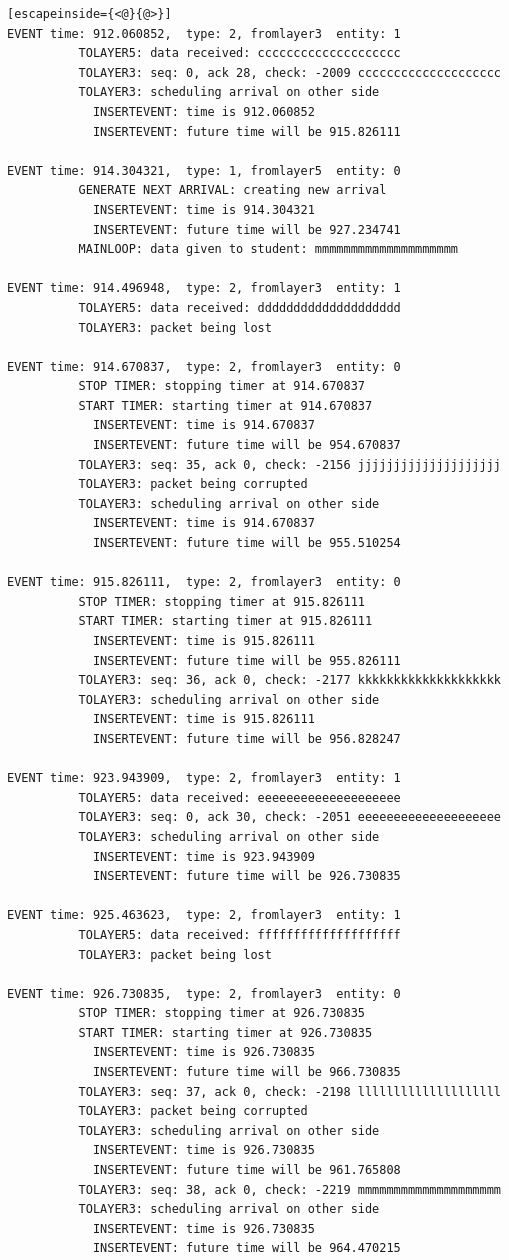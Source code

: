 \documentclass[paper=a4, fontsize=11pt]{scrartcl}
\numberwithin{equation}{section}		%
\numberwithin{figure}{section}			%
\numberwithin{table}{section}				%
\begin{document}
\begin{lstlisting}[escapeinside={<@}{@>}]
EVENT time: 912.060852,  type: 2, fromlayer3  entity: 1
          TOLAYER5: data received: cccccccccccccccccccc
          TOLAYER3: seq: 0, ack 28, check: -2009 cccccccccccccccccccc
          TOLAYER3: scheduling arrival on other side
            INSERTEVENT: time is 912.060852
            INSERTEVENT: future time will be 915.826111

EVENT time: 914.304321,  type: 1, fromlayer5  entity: 0
          GENERATE NEXT ARRIVAL: creating new arrival
            INSERTEVENT: time is 914.304321
            INSERTEVENT: future time will be 927.234741
          MAINLOOP: data given to student: mmmmmmmmmmmmmmmmmmmm

EVENT time: 914.496948,  type: 2, fromlayer3  entity: 1
          TOLAYER5: data received: dddddddddddddddddddd
          TOLAYER3: packet being lost

EVENT time: 914.670837,  type: 2, fromlayer3  entity: 0
          STOP TIMER: stopping timer at 914.670837
          START TIMER: starting timer at 914.670837
            INSERTEVENT: time is 914.670837
            INSERTEVENT: future time will be 954.670837
          TOLAYER3: seq: 35, ack 0, check: -2156 jjjjjjjjjjjjjjjjjjjj
          TOLAYER3: packet being corrupted
          TOLAYER3: scheduling arrival on other side
            INSERTEVENT: time is 914.670837
            INSERTEVENT: future time will be 955.510254

EVENT time: 915.826111,  type: 2, fromlayer3  entity: 0
          STOP TIMER: stopping timer at 915.826111
          START TIMER: starting timer at 915.826111
            INSERTEVENT: time is 915.826111
            INSERTEVENT: future time will be 955.826111
          TOLAYER3: seq: 36, ack 0, check: -2177 kkkkkkkkkkkkkkkkkkkk
          TOLAYER3: scheduling arrival on other side
            INSERTEVENT: time is 915.826111
            INSERTEVENT: future time will be 956.828247

EVENT time: 923.943909,  type: 2, fromlayer3  entity: 1
          TOLAYER5: data received: eeeeeeeeeeeeeeeeeeee
          TOLAYER3: seq: 0, ack 30, check: -2051 eeeeeeeeeeeeeeeeeeee
          TOLAYER3: scheduling arrival on other side
            INSERTEVENT: time is 923.943909
            INSERTEVENT: future time will be 926.730835

EVENT time: 925.463623,  type: 2, fromlayer3  entity: 1
          TOLAYER5: data received: ffffffffffffffffffff
          TOLAYER3: packet being lost

EVENT time: 926.730835,  type: 2, fromlayer3  entity: 0
          STOP TIMER: stopping timer at 926.730835
          START TIMER: starting timer at 926.730835
            INSERTEVENT: time is 926.730835
            INSERTEVENT: future time will be 966.730835
          TOLAYER3: seq: 37, ack 0, check: -2198 llllllllllllllllllll
          TOLAYER3: packet being corrupted
          TOLAYER3: scheduling arrival on other side
            INSERTEVENT: time is 926.730835
            INSERTEVENT: future time will be 961.765808
          TOLAYER3: seq: 38, ack 0, check: -2219 mmmmmmmmmmmmmmmmmmmm
          TOLAYER3: scheduling arrival on other side
            INSERTEVENT: time is 926.730835
            INSERTEVENT: future time will be 964.470215


\end{lstlisting}
\end{document}
